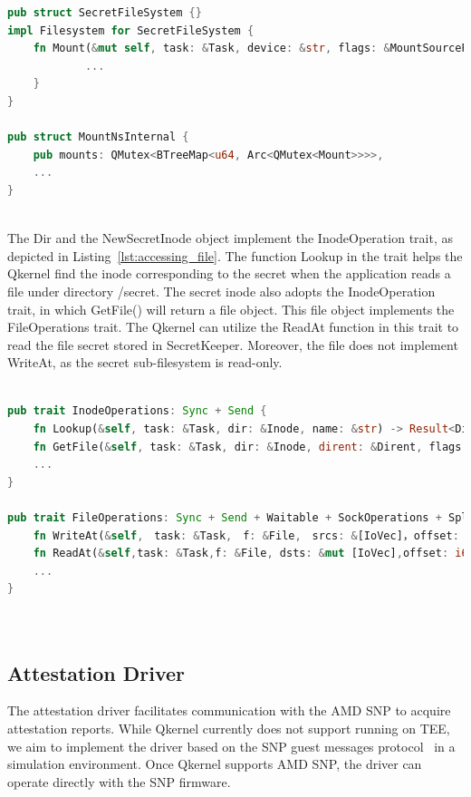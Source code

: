 \begin{lstlisting}[language=rust, caption= API for secret file system, label={lst:sub_filesystem}]
pub struct SecretFileSystem {}
impl Filesystem for SecretFileSystem {
    fn Mount(&mut self, task: &Task, device: &str, flags: &MountSourceFlags, data: &str) -> Result<Inode> {
            ...
    }
}

pub struct MountNsInternal {
    pub mounts: QMutex<BTreeMap<u64, Arc<QMutex<Mount>>>>,
    ...
}
      
\end{lstlisting}

The Dir and the NewSecretInode object implement the InodeOperation trait, as depicted in Listing~\ref{lst:accessing_file}. The function Lookup in the trait helps the Qkernel find the inode corresponding to the secret when the application reads a file under directory /secret. The secret inode also adopts the InodeOperation trait, 
in which GetFile() will return a file object. This file object implements the FileOperations trait. The Qkernel can utilize the ReadAt function in this trait to read the file secret stored in SecretKeeper. Moreover, the file does not implement WriteAt, as the secret sub-filesystem is read-only.

\begin{lstlisting}[language=rust, caption= Interface for accessing the file type secrets, label={lst:accessing_file}]

pub trait InodeOperations: Sync + Send {
    fn Lookup(&self, task: &Task, dir: &Inode, name: &str) -> Result<Dirent>;
    fn GetFile(&self, task: &Task, dir: &Inode, dirent: &Dirent, flags: FileFlags) -> Result<File>;
    ...
}

pub trait FileOperations: Sync + Send + Waitable + SockOperations + SpliceOperations {
    fn WriteAt(&self,　task: &Task,　f: &File,　srcs: &[IoVec]，offset: i64,_blocking: bool) -> Result<i64>;
    fn ReadAt(&self,task: &Task,f: &File, dsts: &mut [IoVec],offset: i64, _blocking: bool,) -> Result<i64>;
    ...
}
    
      
\end{lstlisting}

\subsection{Attestation Driver}
The attestation driver facilitates communication with the AMD SNP to acquire attestation reports. While Qkernel currently does not support running on TEE, we aim to implement the driver based on the SNP  guest messages protocol~\cite*{snp_firmware} in a simulation environment. Once Qkernel supports 
AMD SNP, the driver can operate directly with the SNP firmware. 


